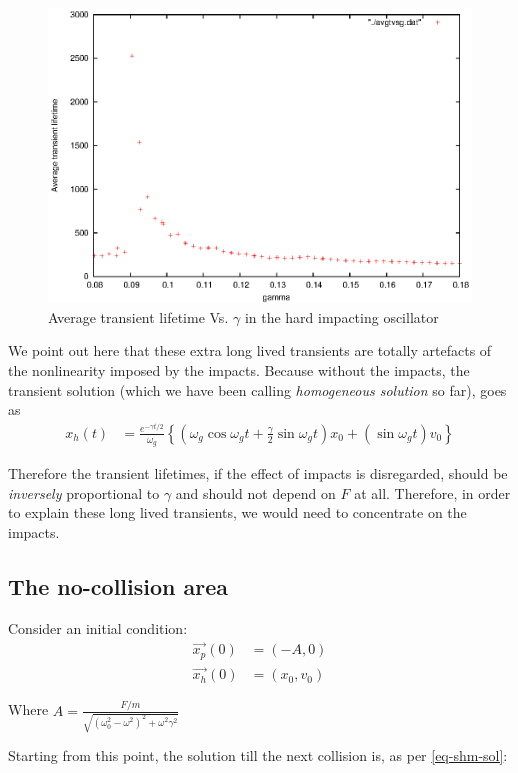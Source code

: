 \documentclass[oneside]{book}
\renewcommand{\(}{\begin{columns}}
\renewcommand{\)}{\end{columns}}
\newcommand{\<}[1]{\begin{column}{#1}}
\renewcommand{\>}{\end{column}}
\begin{document}
\begin{figure}[!htp]
\caption{Average transient lifetime Vs.  $\gamma$ in the hard impacting oscillator}
\label{fig-tvsg}
\begin{center}
\includegraphics[width=0.7\columnwidth]{avgtauvsg-wofit}
\end{center}
\end{figure}

We point out here that these extra long lived transients are totally artefacts 
of the nonlinearity imposed by the impacts.  Because without the impacts, the 
transient solution (which we have been calling \emph{homogeneous solution} so 
far), goes as 
\begin{align}
x_h(t)&=\frac{e^{-\gamma t/2}}{\omega_g}\left\{(\omega_g\cos{\omega_gt}+\frac{\gamma}{2}\sin{\omega_gt})x_0 + (\sin{\omega_gt})v_0 \right\}
\end{align}

Therefore the transient lifetimes, if the effect of impacts is disregarded, should be \emph{inversely} proportional to 
$\gamma$ and should not depend on $F$ at all.  Therefore, in order to explain 
these long lived transients, we would need to concentrate on the impacts.  

\subsection{The no-collision area}
Consider an initial condition:
\begin{align*}
\vec{x_p}(0)&=(-A,0)\\
\vec{x_h}(0)&=(x_0,v_0)
\end{align*}

Where $A=\frac{F/m}{\sqrt{(\omega_0^2-\omega^2)^2+\omega^2\gamma^2}}$

Starting from this point, the solution till the next collision is, as per \eqref{eq-shm-sol}:
\end{document}
